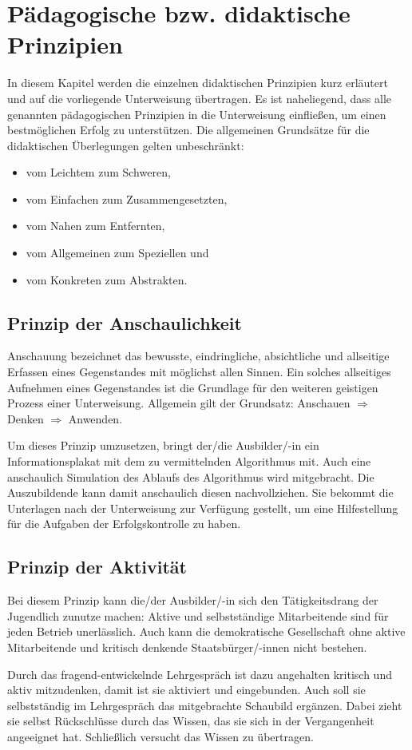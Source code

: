 \chapter{Pädagogische bzw. didaktische Prinzipien}
In diesem Kapitel werden die einzelnen didaktischen Prinzipien kurz erläutert und auf die vorliegende Unterweisung übertragen. Es ist naheliegend, dass alle genannten pädagogischen Prinzipien in die Unterweisung einfließen, um einen bestmöglichen Erfolg zu unterstützen. Die allgemeinen Grundsätze für die didaktischen Überlegungen gelten unbeschränkt: 

\begin{itemize}
	\item vom Leichtem zum Schweren,
	\item vom Einfachen zum Zusammengesetzten, 
	\item vom Nahen zum Entfernten, 
	\item vom Allgemeinen zum Speziellen und 
	\item vom Konkreten zum Abstrakten.
	
\end{itemize}

\section{Prinzip der Anschaulichkeit}
Anschauung bezeichnet das bewusste, eindringliche, absichtliche und allseitige Erfassen eines Gegenstandes mit möglichst allen Sinnen. Ein solches allseitiges Aufnehmen eines Gegenstandes ist die Grundlage für den weiteren geistigen Prozess einer Unterweisung.\autocite[vgl.][S.\,161ff.]{schroder_lernen_2010} Allgemein gilt der Grundsatz: Anschauen $\Rightarrow$ Denken $\Rightarrow$ Anwenden.
\par
Um dieses Prinzip umzusetzen, bringt der/die Ausbilder/-in ein Informationsplakat mit dem zu vermittelnden Algorithmus mit. Auch eine anschaulich Simulation des Ablaufs des Algorithmus wird mitgebracht. Die Auszubildende kann damit anschaulich diesen nachvollziehen. Sie bekommt die Unterlagen nach der Unterweisung zur Verfügung gestellt, um eine Hilfestellung für die Aufgaben der Erfolgskontrolle zu haben.

\section{Prinzip der Aktivität}
Bei diesem Prinzip kann die/der Ausbilder/-in sich den Tätigkeitsdrang der Jugendlich zunutze machen: Aktive und selbstständige Mitarbeitende sind für jeden Betrieb unerlässlich. Auch kann die demokratische Gesellschaft ohne aktive Mitarbeitende und kritisch denkende Staatsbürger/-innen nicht bestehen.
\par
Durch das fragend-entwickelnde Lehrgespräch ist \Azubi dazu angehalten kritisch und aktiv mitzudenken, damit ist sie aktiviert und eingebunden. Auch soll sie selbstständig im Lehrgespräch das mitgebrachte Schaubild ergänzen. Dabei zieht sie selbst Rückschlüsse durch das Wissen, das sie sich in der Vergangenheit angeeignet hat. Schließlich versucht \Azubi das Wissen zu übertragen. 

